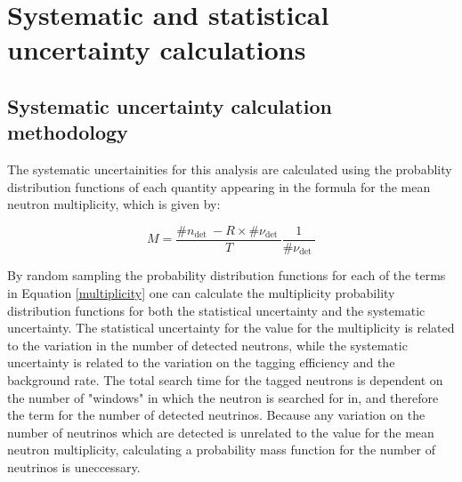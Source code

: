 \chapter{Systematic and statistical uncertainty calculations}
\label{chp:syst}



\section{Systematic uncertainty calculation methodology}


The systematic uncertainities for this analysis are calculated using the probablity distribution functions of each quantity appearing in the formula for the mean neutron multiplicity, which is given by:

\begin{equation}
    M=\frac{\# n_{\text {det }}-R \times \# \nu_{\text {det }}}{T} \frac{1}{\# \nu_{\text {det }}}
 \label{multiplicity}
\end{equation}



By random sampling the probability distribution functions for each of the terms in Equation \eqref{multiplicity} one can calculate the multiplicity probability distribution functions for both the statistical uncertainty and the systematic uncertainty. The statistical uncertainty for the value for the multiplicity is related to the variation in the number of detected neutrons, while the systematic uncertainty is related to the variation on the tagging efficiency and the background rate. The total search time for the tagged neutrons is dependent on the number of "windows" in which the neutron is searched for in, and therefore the term for the number of detected neutrinos. Because any variation on the number of neutrinos which are detected is unrelated to the value for the mean neutron multiplicity, calculating a probability mass function for the number of neutrinos is uneccessary. 

